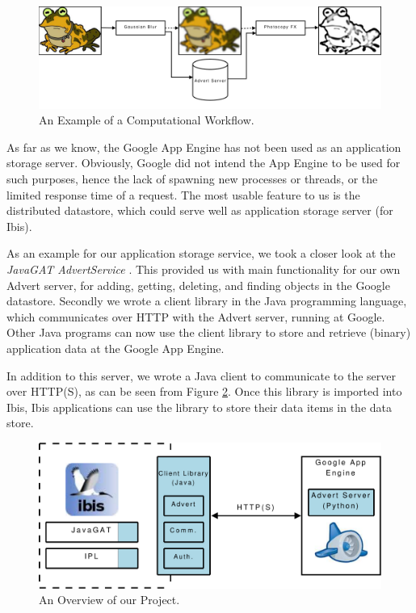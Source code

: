 \begin{figure}[ht] %
\begin{center}
\includegraphics[width=14cm]{./figures/image_workflow.pdf} 
\caption{An Example of a Computational Workflow.\label{img-workflow}}
\end{center}
\end{figure}

As far as we know, the Google App Engine has not been used as an application
storage server. Obviously, Google did not intend the App Engine to be used for
such purposes, hence the lack of spawning new processes or threads, or the
limited response time of a request. The most usable feature to us is the
distributed datastore, which could serve well as application storage
server (for Ibis). 

As an example for our application storage service, we took a closer look at
the \emph{JavaGAT AdvertService} \cite{javagat-www}. This provided us with main
functionality for our own Advert server, for adding, getting, deleting, and
finding objects in the Google datastore. Secondly we wrote a client library in
the Java programming language, which communicates over HTTP with the Advert
server, running at Google. Other Java programs can now use the client library
to store and retrieve (binary) application data at the Google App Engine.

In addition to this server, we wrote a Java client to communicate to the
server over HTTP(S), as can be seen from Figure \ref{introduction-overview}.
Once this library is imported into Ibis, Ibis applications can use the
library to store their data items in the data store.

\begin{figure}[ht] %
\begin{center}
\includegraphics[width=14cm]{./figures/project_design.pdf} 
\caption{An Overview of our Project.\label{introduction-overview}}
\end{center}
\end{figure}

